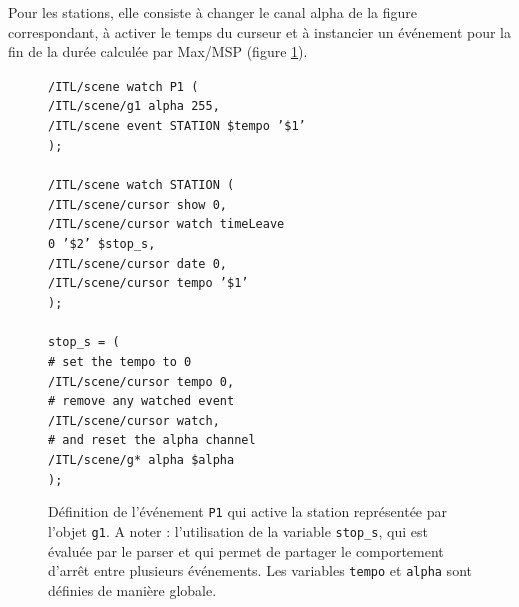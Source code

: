 \documentclass{article}
\newcommand{\OSC}[1]	{{\fontsize{9pt}{9pt} \selectfont\texttt{#1}}}
\newcommand{\tab}{\hspace*{4mm}}
\newcommand{\sample}[1]		{\vspace{-0.2em}\begin{center}\colorbox{mygrey}{\begin{minipage}[t]{0.98\columnwidth} {\small \texttt{#1}}\end{minipage}}\end{center}}
\begin{document}
Pour les stations, elle consiste à changer le canal alpha de la figure correspondant, à activer le temps du curseur et à instancier un événement pour la fin de la durée calculée par Max/MSP (figure \ref{fig:station}). 
\begin{figure}[h]
   \centering
\sample{/ITL/scene watch P1 ( \\
\tab/ITL/scene/g1 alpha 255, \\
\tab/ITL/scene event STATION \$tempo '\$1' \\
); \\
\\
/ITL/scene watch STATION ( \\
\tab/ITL/scene/cursor show 0,\\
\tab/ITL/scene/cursor watch timeLeave \\
\hspace*{30mm}0 '\$2' \$stop\_s,\\
\tab/ITL/scene/cursor date 0,\\
\tab/ITL/scene/cursor tempo '\$1'\\
); \\
\\
stop\_s = ( \\
\tab\# set the tempo to 0 \\
\tab/ITL/scene/cursor tempo 0, \\
\tab\# remove any watched event \\
\tab/ITL/scene/cursor watch,  \\
\tab\# and reset the alpha channel \\
\tab/ITL/scene/g* alpha \$alpha \\
);
}
   \caption{Définition de l'événement \OSC{P1} qui active la station représentée par l'objet \OSC{g1}. A noter : l'utilisation de la variable \OSC{stop\_s}, qui est évaluée par le parser et qui permet de partager le comportement d'arrêt entre plusieurs événements. Les variables \OSC{tempo} et \OSC{alpha} sont définies de manière globale.}
   \label{fig:station}
\end{figure}
\end{document}
